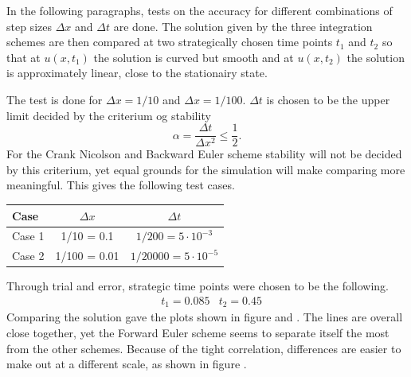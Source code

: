In the following paragraphs, tests on the accuracy for different
combinations of step sizes $\Delta x$ and $\Delta t$ are done. The
solution given by the three integration schemes are then compared
at two strategically chosen time points $t_1$ and $t_2$ so that at
$u(x, t_1)$ the solution is curved but smooth and at $u(x, t_2)$
the solution is approximately linear, close to the stationairy
state.

The test is done for $\Delta x = 1/10$ and $\Delta x = 1/100$.
$\Delta t$ is chosen to be the upper limit decided by the criterium
og stability \[ \alpha = \frac{\Delta t}{\Delta x^2} \leq
\frac{1}{2}. \] For the Crank Nicolson and Backward Euler scheme
stability will not be decided by this criterium, yet equal grounds
for the simulation will make comparing more meaningful. This gives
the following test cases.

\begin{center}
\begin{tabular}[htbp]{|l|c|c|}
    \hline
    Case & $\Delta x$ & $\Delta t$ \\
    \hline
    \hline
    Case 1 & 1/10 = 0.1 & $1/200 = 5 \cdot 10^{-3}$ \\
    \hline
    Case 2 & 1/100 = 0.01 & $1/20000 = 5 \cdot 10^{-5}$ \\
    \hline
\end{tabular}
\end{center}

Through trial and error, strategic time points were chosen to be
the following.
\begin{align*}
    & t_1 = 0.085 & t_2 = 0.45
\end{align*}
Comparing the solution gave the plots shown in figure
 and . The lines are overall close
together, yet the Forward Euler scheme seems to separate itself the
most from the other schemes. Because of the tight correlation,
differences are easier to make out at a different scale, as shown
in figure .

